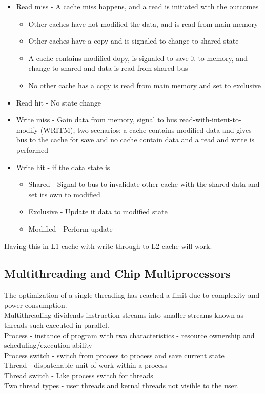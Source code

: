 \documentclass[12pt, a4paper]{article}
\begin{document}
				\begin{itemize}
					\item Read miss - A cache miss happens, and a read is initiated with the outcomes
					\begin{itemize}
						\item Other caches have not modified the data, and is read from main memory
						\item Other caches have a copy and is signaled to change to shared state
						\item A cache contains modified dopy, is signaled to save it to memory, and change to shared and data is read from shared bus
						\item No other cache has a copy is read from main memory and set to exclusive
					\end{itemize}
					\item Read hit - No state change
					\item Write miss - Gain data from memory, signal to bus read-with-intent-to-modify (WRITM), two scenarios: a cache contains modified data and gives bus to the cache for save and no cache contain data and a read and write is performed
					\item Write hit - if the data state is
					\begin{itemize}
						\item Shared - Signal to bus to invalidate other cache with the shared data and set its own to modified
						\item Exclusive  - Update it data to modified state
						\item Modified - Perform update
					\end{itemize}
				\end{itemize}
				Having this in L1 cache with write through to L2 cache will work.
		\subsection{Multithreading and Chip Multiprocessors}
			The optimization of a single threading has reached a limit due to complexity and power consumption.\\
			Multithreading dividends instruction streams into smaller streams known as threads such executed in parallel.\\
			Process - instance of program with two characteristics - resource ownership and scheduling/execution  ability\\
			Process switch - switch from process to process and save current state\\
			Thread - dispatchable unit of work within a process\\
			Thread switch - Like process switch for threads\\
			Two thread types - user threads and kernal threads not visible to the user.\\
\end{document}
